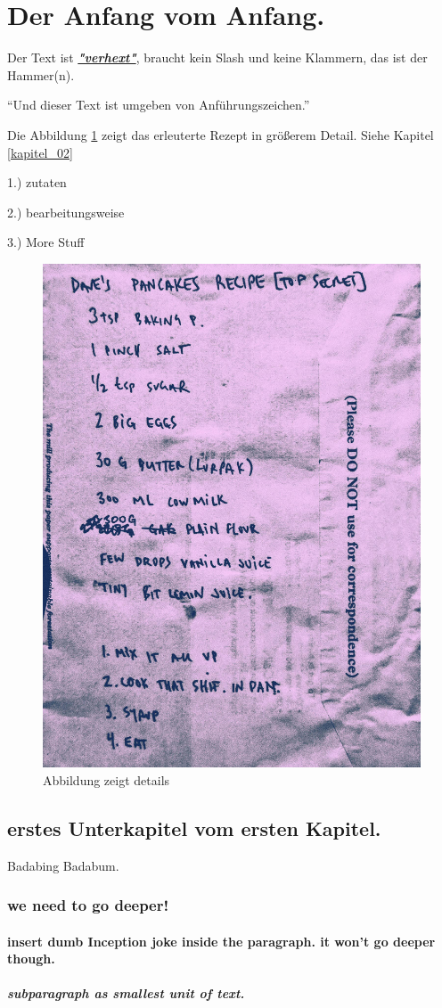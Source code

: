 \section{Der Anfang vom Anfang.}
    Der Text ist \underline{\textit{\textbf{"verhext"}}}, braucht kein Slash und keine Klammern, 
    das ist der Hammer(n).

    \enquote{Und dieser Text ist umgeben von Anführungszeichen.}
    
    
        Die Abbildung \ref{fig:DAVES_PANCAKES_RECIPE} zeigt das erleuterte Rezept
        in größerem Detail. 
        \newline
        Siehe Kapitel \ref{kapitel_02} 

        1.) zutaten

        2.) bearbeitungsweise

        3.) More Stuff

        \begin{figure}[H]
            \centering
            \includegraphics[width=0.5\linewidth]{graphics/DAVES_PANCAKES_RECIPE.jpg}
            \caption[cooles rezept]{Abbildung zeigt details}
    
            
            \label{fig:DAVES_PANCAKES_RECIPE}
        \end{figure}
        
        \subsection {erstes Unterkapitel vom ersten Kapitel.}
        Badabing Badabum.

            \subsubsection{we need to go deeper!}

                \paragraph{insert dumb Inception joke inside the paragraph. it won't go deeper though.} 
                   
                    \subparagraph{subparagraph as smallest unit of text.}


                    
        